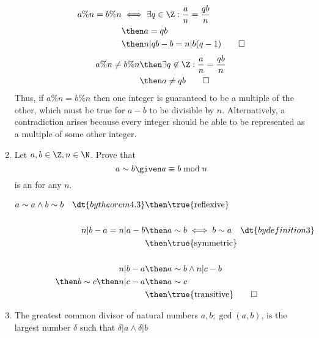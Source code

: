 \documentclass[basic, header]{nosvagor-notes}
\begin{document}
\begin{enumerate}[itemsep=8em]
      \begin{align*}
        a\%n = b\%n &\iff \exists q \in \Z : \frac{a}{n} = \frac{qb}{n} \\
                    &\then a=qb \\
                    &\then n|qb-b = n|b(q-1) \qed
      \end{align*}
      \begin{align*}
        a\%n \neq b\%n &\then \exists q \not\in \Z : \frac{a}{n} = \frac{qb}{n} \\
                       &\then a \neq qb \qed
      \end{align*}
      Thus, if \(a\%n = b\%n\) then one integer is guaranteed to be a
      multiple of the other, which must be true for \(a-b\) to be divisible by
      \(n\). Alternatively, a contradiction arises because every integer should
      be able to be represented as a multiple of some other integer.

  \newpage %

    \item Let \(a, b \in \Z, n \in \N\). Prove that \[a \sim b \given a \equiv
      b \bmod n\]
      is an
      for any \(n\).

      \begin{align*}
        a\sim a \land b \sim b \quad \dt{by theorem 4.3} &\then \text{\true{reflexive}} \\\\
        n|b-a = n|a-b &\then
        a \sim b \iff b \sim a
        \quad \dt{by definition 3} \\
                         &\then \text{\true{symmetric}} \\\\
        n|b-a &\then a \sim b \land n|c-b \\
              \then b \sim c \then n|c-a &\then a \sim c \\
                         &\then \text{\true{transitive}} \qed
      \end{align*}

\vspace{-7em}

    \item The greatest common divisor of natural numbers \(a, b; \gcd(a,b) \),
      is the largest number \(\delta\) such that \(\delta|a \land \delta|b\)
      \begin{enumerate}


\end{enumerate}
\end{enumerate}
\end{document}
